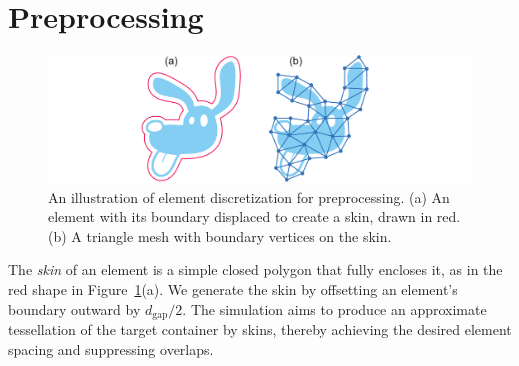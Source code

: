 \section{Preprocessing}
\label{repulsionpak_preprocessing}

\begin{figure}[t] %
\centering
\includegraphics[width=1.0\textwidth]{figures/repulsionpak/element_skin_triangles_2.pdf}
\caption[Element discretization]{
	\label{fig_elements_image}
	An illustration of element discretization for preprocessing.
	(a) An element with its boundary displaced to create a skin, drawn in red.
	(b) A triangle mesh with boundary vertices on the skin.
}
\end{figure}




The \textit{skin} of an element is a simple closed polygon 
that fully encloses it, 
as in the red shape in Figure~\ref{fig_elements_image}(a).
We generate the skin 
by offsetting 
an element's boundary outward by $d_\mathrm{gap}/2$. 
The simulation aims to produce an approximate tessellation of the target
container by  skins, thereby achieving the desired element spacing and
suppressing overlaps.

